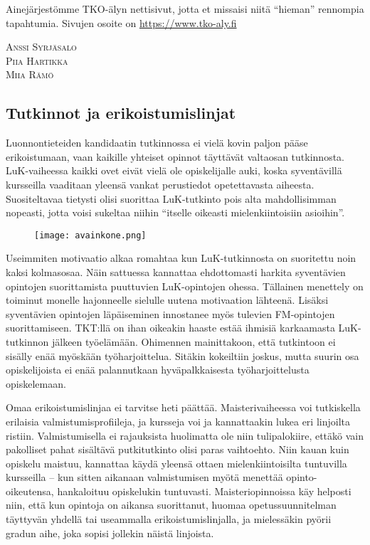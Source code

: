 \documentclass[../ala_hataile.tex]{subfiles}
\begin{document}
	Ainejärjestömme TKO-älyn nettisivut,
	jotta et missaisi niitä ``hieman'' rennompia
	tapahtumia. Sivujen osoite on \url{https://www.tko-aly.fi}
	
	\vspace{0.5cm}
	\noindent\textsc{Anssi Syrjäsalo}\\
	\textsc{Piia Hartikka}\\
	\textsc{Miia Rämö}
	
	
	\subsection*{Tutkinnot ja erikoistumislinjat}
	
	Luonnontieteiden kandidaatin tutkinnossa
	ei vielä kovin paljon pääse erikoistumaan,
	vaan kaikille yhteiset opinnot
	täyttävät valtaosan tutkinnosta. LuK-vaiheessa
	kaikki ovet eivät vielä ole opiskelijalle
	auki, koska syventävillä
	kursseilla vaaditaan yleensä vankat perustiedot
	opetettavasta aiheesta. Suositeltavaa
	tietysti olisi suorittaa LuK-tutkinto pois
	alta mahdollisimman nopeasti, jotta voisi
	sukeltaa niihin ``itselle oikeasti mielenkiintoisiin
	asioihin''.
	\begin{figure}[b]
		\centering
		\texttt{[image: avainkone.png]}
	\end{figure}
	
	Useimmiten motivaatio alkaa romahtaa
	kun LuK-tutkinnosta on suoritettu noin
	kaksi kolmasosaa. Näin sattuessa kannattaa
	ehdottomasti harkita syventävien opintojen
	suorittamista puuttuvien LuK-opintojen
	ohessa. Tällainen menettely on toiminut
	monelle hajonneelle sielulle uutena motivaation
	lähteenä. Lisäksi syventävien
	opintojen läpäiseminen innostanee myös
	tulevien FM-opintojen suorittamiseen. TKT:llä
	on ihan oikeakin haaste estää ihmisiä
	karkaamasta LuK-tutkinnon jälkeen
	työelämään. Ohimennen mainittakoon, että
	tutkintoon ei sisälly enää myöskään työharjoittelua.
	Sitäkin kokeiltiin joskus, mutta
	suurin osa opiskelijoista ei enää palannutkaan
	hyväpalkkaisesta työharjoittelusta
	opiskelemaan.
	
	Omaa erikoistumislinjaa ei tarvitse heti
	päättää. Maisterivaiheessa voi tutkiskella
	erilaisia valmistumisprofiileja, ja kursseja
	voi ja kannattaakin lukea eri linjoilta ristiin.
	Valmistumisella ei rajauksista huolimatta
	ole niin tulipalokiire, ettäkö vain pakolliset
	pahat sisältävä putkitutkinto olisi paras
	vaihtoehto. Niin kauan kuin opiskelu maistuu,
	kannattaa käydä yleensä ottaen mielenkiintoisilta
	tuntuvilla kursseilla -- kun sitten
	aikanaan valmistumisen myötä menettää
	opinto-oikeutensa, hankaloituu opiskelukin
	tuntuvasti. Maisteriopinnoissa käy helposti
	niin, että kun opintoja on aikansa suorittanut,
	huomaa opetus\-suunnitelman täyttyvän
	yhdellä tai useammalla erikoistumislinjalla,
	ja mielessäkin pyörii gradun aihe, joka
	sopisi jollekin näistä linjoista.
	
\end{document}
